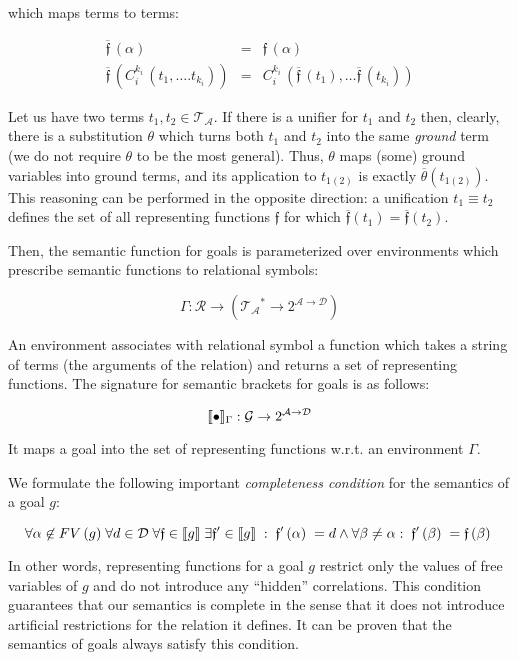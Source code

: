 which maps terms to terms:

\[
\begin{array}{rcl}

  \overline{\mathfrak f}\,(\alpha) & = & \mathfrak f\,(\alpha)\\
  \overline{\mathfrak f}\,(C_i^{k_i}\,(t_1,\dots.t_{k_i})) & = & C_i^{k_i}\,(\overline{\mathfrak f}\,(t_1),\dots \overline{\mathfrak f}\,(t_{k_i}))
\end{array}
\]

Let us have two terms $t_1, t_2\in\mathcal{T_A}$. If there is a unifier for $t_1$ and $t_2$ then, clearly, there is a substitution $\theta$ which
turns both $t_1$ and $t_2$ into the same \emph{ground} term (we do not require $\theta$ to be the most general). Thus, $\theta$ maps
(some) ground variables into ground terms, and its application to $t_{1(2)}$ is exactly $\overline{\theta}(t_{1(2)})$. This reasoning can be
performed in the opposite direction: a unification $t_1\equiv t_2$ defines the set of all representing functions $\mathfrak{f}$ for which
$\overline{\mathfrak{f}}(t_1)=\overline{\mathfrak{f}}(t_2)$. 

Then, the semantic function for goals is parameterized over environments which prescribe semantic functions to relational symbols:

\[
  \Gamma : \mathcal{R} \to (\mathcal{T_A}^*\to 2^{\mathcal{A}\to\mathcal{D}})
\]

An environment associates with relational symbol a function which takes a string of terms (the arguments of the relation) and returns a set of
representing functions. The signature for semantic brackets for goals is as follows:

\[
\llbracket{\bullet}\rrbracket_{\Gamma} : \mathcal{G}\to 2^{\mathcal{A}\to\mathcal{D}}
\]

It maps a goal into the set of representing functions w.r.t. an environment $\Gamma$.

We formulate the following important \emph{completeness condition} for the semantics of a goal $g$:

\[
\forall\alpha\not\in FV\,(g)\; \forall d \in \mathcal{D}\; \forall\mathfrak{f} \in \llbracket{g}\rrbracket\; \exists \mathfrak{f'} \in \llbracket{g}\rrbracket \;:\; \mathfrak{f'}\,(\alpha)\; = d \wedge \forall \beta \neq \alpha:\; \mathfrak{f'}\,(\beta)\; = \mathfrak{f}\,(\beta)\; 
\]

In other words, representing functions for a goal $g$ restrict only the values of free variables of $g$ and do not introduce any ``hidden'' correlations.
This condition guarantees that our semantics is complete in the sense that it does not introduce artificial restrictions for the relation it defines. It
can be proven that the semantics of goals always satisfy this condition.

